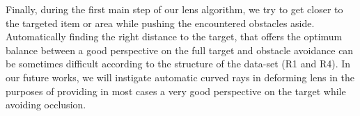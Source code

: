 Finally, during the first main step of our lens algorithm, we try to get closer to the targeted item or area while pushing the encountered obstacles aside. Automatically finding the right distance to the target, that offers the optimum balance between a good perspective on the full target and obstacle avoidance can be sometimes difficult according to the structure of the data-set (R1 and R4). In our future works, we will instigate automatic curved rays in deforming lens in the purposes of providing in most cases a very good perspective on the target while avoiding occlusion. 
